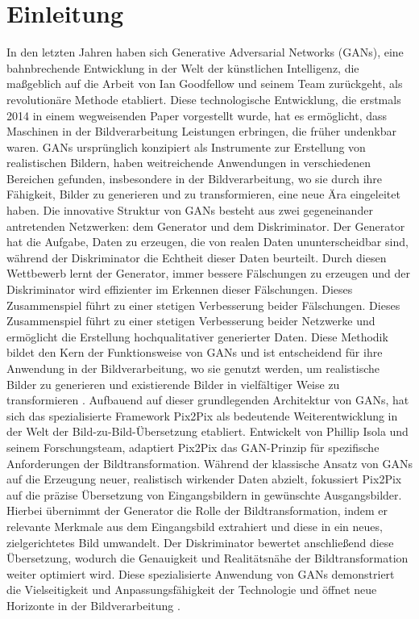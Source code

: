 \chapter{Einleitung}
In den letzten Jahren haben sich Generative Adversarial Networks (GANs), eine bahnbrechende Entwicklung in der Welt der künstlichen Intelligenz, die maßgeblich auf die Arbeit von Ian Goodfellow und seinem Team zurückgeht, als revolutionäre Methode etabliert. Diese technologische Entwicklung, die erstmals 2014 in einem wegweisenden Paper vorgestellt wurde, hat es ermöglicht, dass Maschinen in der Bildverarbeitung Leistungen erbringen, die früher undenkbar waren. GANs ursprünglich konzipiert als Instrumente zur Erstellung von realistischen Bildern, haben weitreichende Anwendungen in verschiedenen Bereichen gefunden, insbesondere in der Bildverarbeitung, wo sie durch ihre Fähigkeit, Bilder zu generieren und zu transformieren, eine neue Ära eingeleitet haben. \newline
Die innovative Struktur von GANs besteht aus zwei gegeneinander antretenden Netzwerken: dem Generator und dem Diskriminator. Der Generator hat die Aufgabe, Daten zu erzeugen, die von realen Daten ununterscheidbar sind, während der Diskriminator die Echtheit dieser Daten beurteilt. Durch diesen Wettbewerb lernt der Generator, immer bessere Fälschungen zu erzeugen und der Diskriminator wird effizienter im Erkennen dieser Fälschungen. Dieses Zusammenspiel führt zu einer stetigen Verbesserung beider Fälschungen. Dieses Zusammenspiel führt zu einer stetigen Verbesserung beider Netzwerke und ermöglicht die Erstellung hochqualitativer generierter Daten. Diese Methodik bildet den Kern der Funktionsweise von GANs und ist entscheidend für ihre Anwendung in der Bildverarbeitung, wo sie genutzt werden, um realistische Bilder zu generieren und existierende Bilder in vielfältiger Weise zu transformieren \cite{IanJ.GoodfellowJeanPougetAbadieMehdiMirzaBingXuDavidWardeFarleySherjilOzairAaro.2014}.
\newline
Aufbauend auf dieser grundlegenden Architektur von GANs, hat sich das spezialisierte Framework Pix2Pix als bedeutende Weiterentwicklung in der Welt der Bild-zu-Bild-Übersetzung etabliert. Entwickelt von Phillip Isola und seinem Forschungsteam, adaptiert Pix2Pix das GAN-Prinzip für spezifische Anforderungen der Bildtransformation. Während der klassische Ansatz von GANs auf die Erzeugung neuer, realistisch wirkender Daten abzielt, fokussiert Pix2Pix auf die präzise Übersetzung von Eingangsbildern in gewünschte Ausgangsbilder. Hierbei übernimmt der Generator die Rolle der Bildtransformation, indem er relevante Merkmale aus dem Eingangsbild extrahiert und diese in ein neues, zielgerichtetes Bild umwandelt. Der Diskriminator bewertet anschließend diese Übersetzung, wodurch die Genauigkeit und Realitätsnähe der Bildtransformation weiter optimiert wird. Diese spezialisierte Anwendung von GANs demonstriert die Vielseitigkeit und Anpassungsfähigkeit der Technologie und öffnet neue Horizonte in der Bildverarbeitung \cite{PhillipIsola.}.
